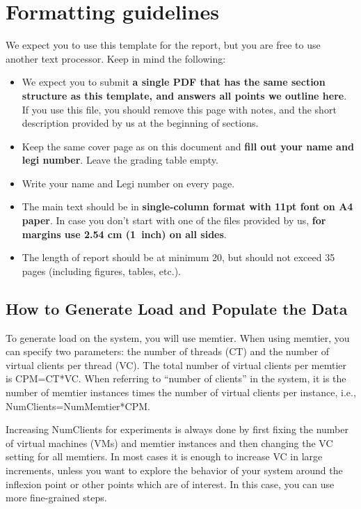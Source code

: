 \documentclass[11pt,a4paper]{article}
\begin{document}
\section*{Formatting guidelines}
We expect you to use this template for the report, but you are free to use another text processor. Keep in mind the following:
\begin{itemize}
	\item  We expect you to submit \textbf{a single PDF that has the same section structure as this template, and answers all points we outline here}. If you use this file, you should remove this page with notes, and the short description provided by us at the beginning of sections.
	\item Keep the same cover page as on this document and \textbf{fill out your name and legi number}. Leave the grading table empty.
	\item Write your name and Legi number on every page.
	\item The main text should be in \textbf{single-column format with 11pt font on A4 paper}. In case you don't start with one of the files provided by us, \textbf{for margins use 2.54 cm (1~inch) on all sides}.
	\item The length of report should be at minimum 20, but should not exceed 35 pages (including figures, tables, etc.). 
\end{itemize}

\subsection*{How to Generate Load and Populate the Data}

To generate load on the system, you will use memtier. When using memtier, you can specify two parameters: the number of threads (CT) and the number of virtual clients per thread (VC). The total number of virtual clients per memtier is CPM=CT*VC. When referring to ``number of clients'' in the system, it is the number of memtier instances times the number of virtual clients per instance, i.e., NumClients=NumMemtier*CPM.

Increasing NumClients for experiments is always done by first fixing the number of virtual machines (VMs) and memtier instances and then changing the VC setting for all memtiers. In most cases it is enough to increase VC in large increments, unless you want to explore the behavior of your system around the inflexion point or other points which are of interest. In this case, you can use more fine-grained steps.
\end{document}
